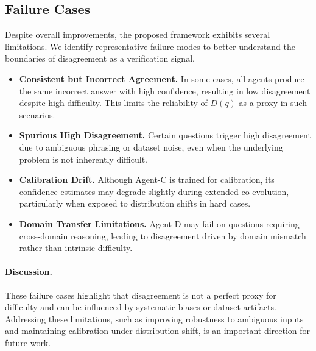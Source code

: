 \documentclass{article}
\begin{document}
\subsection{Failure Cases}

Despite overall improvements, the proposed framework exhibits several limitations. We identify representative failure modes to better understand the boundaries of disagreement as a verification signal.

\begin{itemize}
    \item \textbf{Consistent but Incorrect Agreement.} In some cases, all agents produce the same incorrect answer with high confidence, resulting in low disagreement despite high difficulty. This limits the reliability of $D(q)$ as a proxy in such scenarios.

    \item \textbf{Spurious High Disagreement.} Certain questions trigger high disagreement due to ambiguous phrasing or dataset noise, even when the underlying problem is not inherently difficult.

    \item \textbf{Calibration Drift.} Although Agent-C is trained for calibration, its confidence estimates may degrade slightly during extended co-evolution, particularly when exposed to distribution shifts in hard cases.

    \item \textbf{Domain Transfer Limitations.} Agent-D may fail on questions requiring cross-domain reasoning, leading to disagreement driven by domain mismatch rather than intrinsic difficulty.
\end{itemize}

\paragraph{Discussion.}
These failure cases highlight that disagreement is not a perfect proxy for difficulty and can be influenced by systematic biases or dataset artifacts. Addressing these limitations, such as improving robustness to ambiguous inputs and maintaining calibration under distribution shift, is an important direction for future work.
\end{document}
